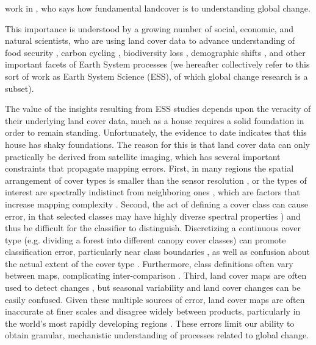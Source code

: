 \documentclass[a4paper]{article}
\begin{document}
work in \citep{verburg_challenges_2011}, who says how fundamental landcover is to understanding global change.  


This importance is understood by a growing number of social, economic, and natural scientists, who are using land cover data to advance understanding of food security \citep{lark_cropland_2015,wright_recent_2013, licker_mind_2010}, carbon cycling \citep{asner_high-resolution_2010, gaveau_major_2014}, biodiversity loss \citep{newbold_global_2015, luoto_predicting_2004}, demographic shifts \citep{linard_assessing_2010}, and other important facets of Earth System processes (we hereafter collectively refer to this sort of work as Earth System Science (ESS), of which global change research is a subset). 

The value of the insights resulting from ESS studies depends upon the veracity of their underlying land cover data, much as a house requires a solid foundation in order to remain standing. Unfortunately, the evidence to date indicates that this house has shaky foundations. The reason for this is that land cover data can only practically be derived from satellite imaging, which has several important constraints that propagate mapping errors. First, in many regions the spatial arrangement of cover types is smaller than the sensor resolution \citep[e.g. smallholder's farms][]{jain_mapping_2013,debats_generalized_2016,ozdogan_resolution_2006}, or the types of interest are spectrally indistinct from neighboring ones \citep{sweeney_mapping_2015,fritz_identifying_2008}, which are factors that increase mapping complexity \citep{yu_meta-discoveries_2014}. Second, the act of defining a cover class can cause error, in that selected classes may have highly diverse spectral properties \citep[e.g. croplands or savannas;][]{fritz_identifying_2008,verburg_challenges_2011,debats_generalized_2016}) and thus be difficult for the classifier to distinguish. Discretizing a continuous cover type (e.g. dividing a forest into different canopy cover classes) can promote classification error, particularly near class boundaries \citep{foody_status_2002}, as well as confusion about the actual extent of the cover type \citep{sexton_conservation_2015}. Furthermore, class definitions often vary between maps, complicating inter-comparison \citep{kuemmerle_challenges_2013,fritz_identifying_2008}. Third, land cover maps are often used to detect changes \citep[e.g.][]{gross_monitoring_2013}, but seasonal variability and land cover changes can be easily confused. Given these multiple sources of error, land cover maps are often inaccurate at finer scales and disagree widely between products, particularly in the world's most rapidly developing regions \citep{estes_projected_2013,fritz_comparison_2010,fritz_cropland_2011,fritz_need_2013}. These errors limit our ability to obtain granular, mechanistic understanding of processes related to global change. 
\end{document}
